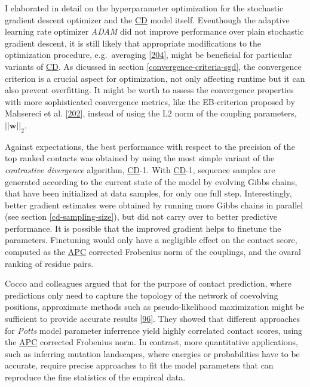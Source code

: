 \documentclass[11pt,a4paper,twoside]{book}
\newcommand{\w}{\mathbf{w}}
\theoremstyle{definition}
\theoremstyle{definition}
\theoremstyle{remark}
\begin{document}
I elaborated in detail on the hyperparameter optimization for the
stochastic gradient descent optimizer and the
\protect\hyperlink{abbrev}{CD} model itself. Eventhough the adaptive
learning rate optimizer \emph{ADAM} did not improve performance over
plain stochastic gradient descent, it is still likely that appropriate
modifications to the optimization procedure, e.g.~averaging
{[}\protect\hyperlink{ref-Ma2016}{204}{]}, might be beneficial for
particular variants of \protect\hyperlink{abbrev}{CD}. As dicussed in
section \ref{convergence-criteria-sgd}, the convergence criterion is a
crucial aspect for optimization, not only affecting runtime but it can
also prevent overfitting. It might be worth to assess the convergence
properties with more sophisticated convergence metrics, like the
EB-criterion proposed by Mahsereci et al.
{[}\protect\hyperlink{ref-Mahsereci2017}{202}{]}, instead of using the
L2 norm of the coupling parameters, \(||\w||_2\).

Against expectations, the best performance with respect to the precision
of the top ranked contacts was obtained by using the most simple variant
of the \emph{contrastive divergence} algorithm,
\protect\hyperlink{abbrev}{CD}-1. With \protect\hyperlink{abbrev}{CD}-1,
sequence samples are generated according to the current state of the
model by evolving Gibbs chains, that have been initialized at data
samples, for only one full step. Interestingly, better gradient
estimates were obtained by running more Gibbs chains in parallel (see
section \ref{cd-sampling-size}), but did not carry over to better
predictive performance. It is possible that the improved gradient helps
to finetune the parameters. Finetuning would only have a negligible
effect on the contact score, computed as the
\protect\hyperlink{abbrev}{APC} corrected Frobenius norm of the
couplings, and the ovaral ranking of residue pairs.

Cocco and colleagues argued that for the purpose of contact prediction,
where predictions only need to capture the topology of the network of
coevolving positions, approximate methods such as pseudo-likelihood
maximization might be sufficient to provide accurate results
{[}\protect\hyperlink{ref-Cocco2017}{96}{]}. They showed that different
approaches for \emph{Potts} model parameter inferrence yield highly
correlated contact scores, using the \protect\hyperlink{abbrev}{APC}
corrected Frobenius norm. In contrast, more quantitative applications,
such as inferring mutation landscapes, where energies or probabilities
have to be accurate, require precise approaches to fit the model
parameters that can reproduce the fine statistics of the empircal data.
\end{document}
